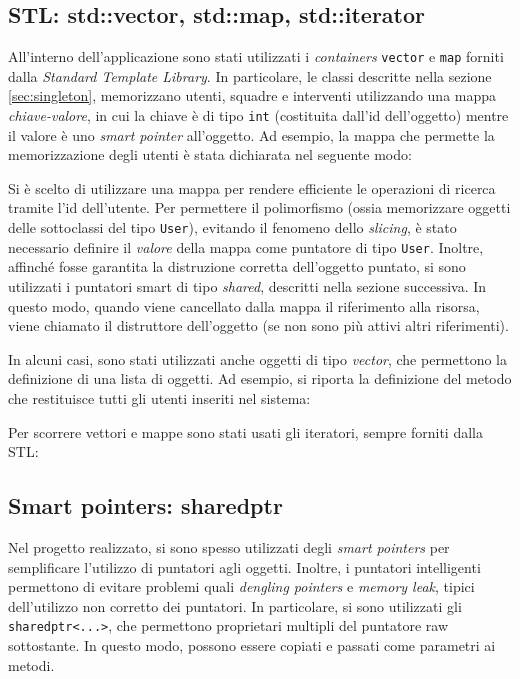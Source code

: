 \subsection{STL: std::vector, std::map, std::iterator}
All'interno dell'applicazione sono stati utilizzati i \textit{containers} \texttt{vector} e \texttt{map} forniti dalla \textit{Standard Template Library}. In particolare, le classi descritte nella sezione \ref{sec:singleton}, memorizzano utenti, squadre e interventi utilizzando una mappa \textit{chiave-valore}, in cui la chiave è di tipo \texttt{int} (costituita dall'id dell'oggetto) mentre il valore è uno \textit{smart pointer} all'oggetto. Ad esempio, la mappa che permette la memorizzazione degli utenti è stata dichiarata nel seguente modo:

Si è scelto di utilizzare una mappa per rendere efficiente le operazioni di ricerca tramite l'id dell'utente. Per permettere il polimorfismo (ossia memorizzare oggetti delle sottoclassi del tipo \texttt{User}), evitando il fenomeno dello \textit{slicing}, è stato necessario definire il \textit{valore} della mappa come puntatore di tipo \texttt{User}. Inoltre, affinché fosse garantita la distruzione corretta dell'oggetto puntato, si sono utilizzati i puntatori smart di tipo \textit{shared}, descritti nella sezione successiva. In questo modo, quando viene cancellato dalla mappa il riferimento alla risorsa, viene chiamato il distruttore dell'oggetto (se non sono più attivi altri riferimenti).

In alcuni casi, sono stati utilizzati anche oggetti di tipo \textit{vector}, che permettono la definizione di una lista di oggetti. Ad esempio, si riporta la definizione del metodo che restituisce tutti gli utenti inseriti nel sistema:


Per scorrere vettori e mappe sono stati usati gli iteratori, sempre forniti dalla STL:


\subsection{Smart pointers: shared\textunderscore ptr} 
Nel progetto realizzato, si sono spesso utilizzati degli \textit{smart pointers} per semplificare l'utilizzo di puntatori agli oggetti. Inoltre, i puntatori intelligenti permettono di evitare problemi quali \textit{dengling pointers} e \textit{memory leak}, tipici dell'utilizzo non corretto dei puntatori. In particolare, si sono utilizzati gli \texttt{shared\textunderscore ptr<...>}, che permettono proprietari multipli del puntatore raw sottostante. In questo modo, possono essere copiati e passati come parametri ai metodi.


